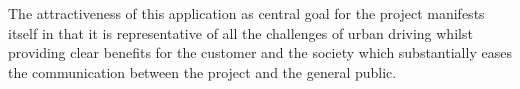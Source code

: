 %	
%
%

The attractiveness of this application as central goal for the project manifests itself in that it is representative of all the challenges of urban driving whilst providing clear benefits for the customer and the society which substantially eases the communication between the project and the general public.

